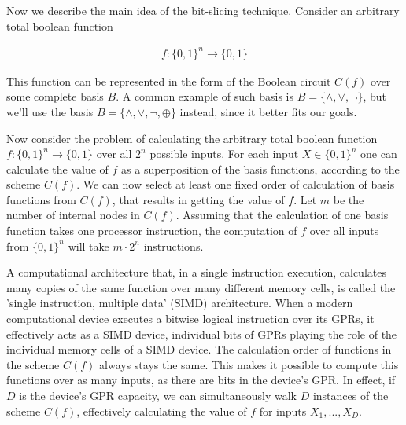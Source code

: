 \documentclass[runningheads,a4paper]{llncs}[2015/06/24]
\begin{document}
Now we describe the main idea of the bit-slicing technique. Consider an
arbitrary total boolean function

\begin{gather*} 
	f:\{0,1\}^n\rightarrow\{0,1\}
\end{gather*}

This function can be represented in the form of the Boolean circuit $C(f)$ over
some complete basis $B$. A common example of such basis is
$B=\{\land,\lor,\neg\}$, but we'll use the basis $B=\{\land,\lor,\neg,\oplus\}$
instead, since it better fits our goals.

Now consider the problem of calculating the arbitrary total boolean function
$f:\{0,1\}^n\rightarrow\{0,1\}$ over all $2^n$ possible inputs. For each input
$X\in\{0,1\}^n$ one can calculate the value of $f$ as a superposition of the
basis functions, according to the scheme $C(f)$. We can now select at least one
fixed order of calculation of basis functions from $C(f)$, that results in
getting the value of $f$. Let $m$ be the number of internal nodes in $C(f)$.
Assuming that the calculation of one basis function takes one processor
instruction, the computation of $f$ over all inputs from $\{0,1\}^n$ will take
$m\cdot2^n$ instructions.

A computational architecture that, in a single instruction execution,
calculates many copies of the same function over many different memory cells,
is called the 'single instruction, multiple data' (SIMD) architecture. When a
modern computational device executes a bitwise logical instruction over its
GPRs, it effectively acts as a SIMD device, individual bits of GPRs playing the
role of the individual memory cells of a SIMD device. The calculation order of
functions in the scheme $C(f)$ always stays the same. This makes it possible to
compute this functions over as many inputs, as there are bits in the device's
GPR.  In effect, if $D$ is the device's GPR capacity, we can simultaneously
walk $D$ instances of the scheme $C(f)$, effectively calculating the value of
$f$ for inputs $X_1,...,X_D$.
\end{document}
